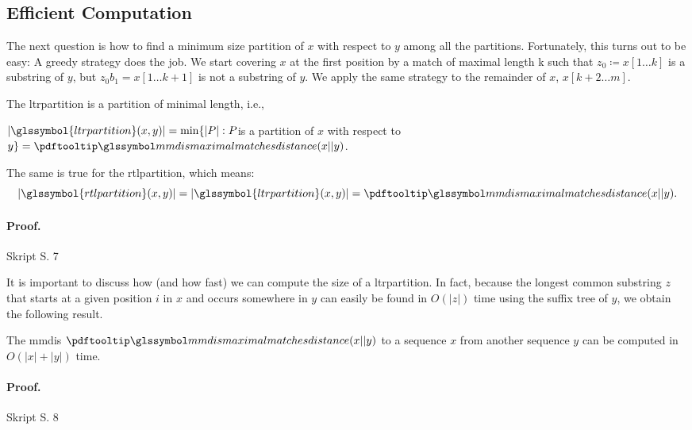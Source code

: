 
\subsection{Efficient Computation}\label{subsec:efficient-computation}
The next question is how to find a minimum size partition of $x$ with respect to $y$ among
all the partitions.
Fortunately, this turns out to be easy: A greedy strategy does the
job.
We start covering $x$ at the first position by a match of maximal length k such that
$z_0 \coloneqq x[1 \dots k]$ is a substring of $y$, but $z_0 b_1 = x[1 \dots k + 1]$ is not a substring of $y$.
We apply the same strategy to the remainder of $x$, $x[k + 2 \dots m]$.


\begin{theo} \label{thm:theorem-1-3}
    The \gls{ltrpartition} is a partition of minimal length, i.e.,
    \begin{center}
        $|\glssymbol{ltrpartition} (x, y)| = \min\{|P | : P $is a partition of $x$ with respect to $y\} = \mmsym(x||y)$.
    \end{center}
    The same is true for the \gls{rtlpartition}, which means:
    \[
        |\glssymbol{rtlpartition} (x, y)| = |\glssymbol{ltrpartition} (x, y)| = \mmsym (x||y).
    \]
    \paragraph{Proof.} Skript S. 7 %
\end{theo}
It is important to discuss how (and how fast) we can compute the size of a \gls{ltrpartition}.
In fact, because the longest common substring $z$ that starts at a given position
$i$ in $x$ and occurs somewhere in $y$ can easily be found in $O(|z|)$ time using the suffix tree
of $y$, we obtain the following result.

\begin{theo} \label{thm:theorem-1-4}
    The \gls{mmdis} $\mmsym(x||y)$ to a sequence $x$ from another sequence
    $y$ can be computed in $ O(|x| + |y|)$ time.
    \paragraph{Proof.} Skript S. 8 %
\end{theo}

